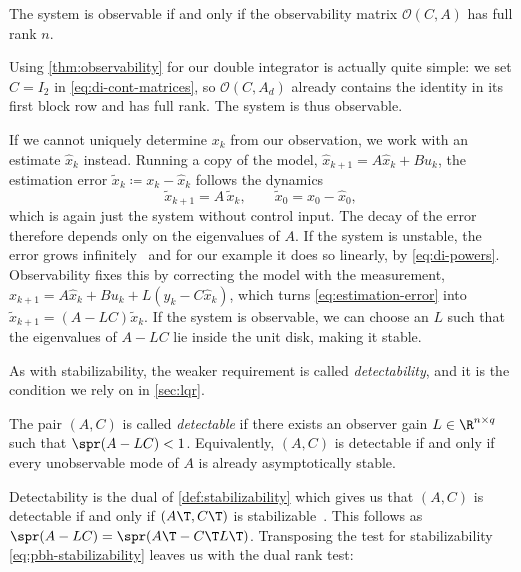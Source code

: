 \begin{theorem}
\label{thm:observability}
The system is observable if and only if the observability matrix
$\mathcal{O}(C, A)$ has full rank $n$.
\end{theorem}

Using \cref{thm:observability} for our double integrator is actually quite simple:
we set $C = I_2$ in \eqref{eq:di-cont-matrices}, so $\mathcal{O}(C, A_d)$
already contains the identity in its first block row and has full rank. The
system is thus observable.

If we cannot uniquely determine $x_k$ from our observation, we work with an
estimate $\hat{x}_k$ instead. Running a copy of the model,
$\hat{x}_{k+1} = A \hat{x}_k + B u_k$, the estimation error
$\tilde{x}_k \coloneqq x_k - \hat{x}_k$ follows the dynamics
\begin{equation}
    \label{eq:estimation-error}
    \tilde{x}_{k+1} = A\, \tilde{x}_k,
    \qquad \tilde{x}_0 = x_0 - \hat{x}_0 ,
\end{equation}
which is again just the system without control input. The decay of the error
therefore depends only on the eigenvalues of $A$.
If the system is unstable, the error grows infinitely~ 
and for our example it does so
linearly, by \eqref{eq:di-powers}. Observability fixes this by correcting
the model with the measurement,
$\hat{x}_{k+1} = A \hat{x}_k + B u_k + L (y_k - C \hat{x}_k)$, which turns
\eqref{eq:estimation-error} into $\tilde{x}_{k+1} = (A - LC) \tilde{x}_k$. If
the system is observable, we can choose an $L$ such that the eigenvalues
of $A - LC$ lie inside the unit disk, making it stable.

As with stabilizability, the weaker requirement is called \emph{detectability}, 
and it is the condition we rely on in \cref{sec:lqr}. 

\begin{definition}[Detectability]
\label{def:detectability}
The pair $(A, C)$ is called \emph{detectable} if there exists an observer gain
$L \in \R^{n \times q}$ such that $\spr(A - LC) < 1$. Equivalently, $(A,C)$ is
detectable if and only if every unobservable mode of $A$ is already
asymptotically stable.
\end{definition}

Detectability is the dual of \cref{def:stabilizability} which gives us
that $(A, C)$ is detectable if and only if $(A\T, C\T)$ is
stabilizable~. This follows as
$\spr(A - LC) = \spr\!\left(A\T - C\T L\T\right)$. Transposing the test
for stabilizability \eqref{eq:pbh-stabilizability} leaves us with the dual rank test:

